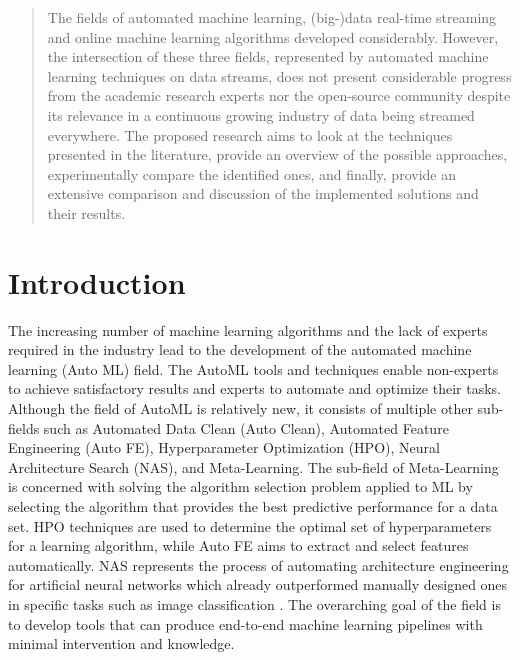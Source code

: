 \documentclass{sig-alternate-br}
\begin{document}
\maketitle

\begin{abstract}
The fields of automated machine learning, (big-)data real-time streaming and online machine learning algorithms developed considerably. However, the intersection of these three fields, represented by automated machine learning techniques on data streams, does not present considerable progress from the academic research experts nor the open-source community despite its relevance in a continuous growing industry of data being streamed everywhere. The proposed research aims to look at the techniques presented in the literature, provide an overview of the possible approaches, experimentally compare the identified ones, and finally, provide an extensive comparison and discussion of the implemented solutions and their results.
\end{abstract}



\section{Introduction}
The increasing number of machine learning algorithms and the lack of experts required in the industry lead to
the development of the automated machine learning (Auto ML) field. The AutoML tools and techniques enable non-experts to achieve
satisfactory results and experts to automate and optimize their tasks. Although the field of AutoML is relatively new, it consists of multiple other sub-fields such as Automated Data Clean (Auto Clean), Automated Feature Engineering (Auto FE), Hyperparameter Optimization (HPO), Neural Architecture Search (NAS), and Meta-Learning. The sub-field of Meta-Learning is concerned with solving the algorithm selection problem \cite{rice1976algorithm} applied to ML by selecting the algorithm that provides the best predictive performance for a data set. HPO techniques are used to determine the optimal set of hyperparameters for a learning algorithm, while Auto FE aims to extract and select features automatically. NAS represents the process of automating architecture engineering for artificial neural networks which already outperformed manually designed ones in specific tasks such as image classification \cite{elsken2018neural}. The overarching goal of the field is to develop tools that can produce end-to-end machine learning pipelines with minimal intervention and knowledge.
\end{document}
